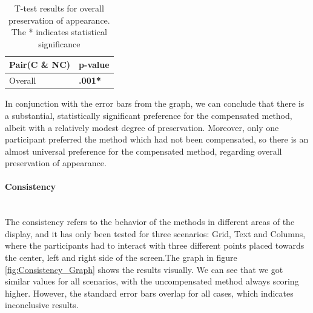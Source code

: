 \documentclass[]{article}
\begin{document}
\begin{table}
\begin{center}
    \begin{tabular}{ | l | l |}
    \hline
    Pair(C \& NC) & \textbf{p-value }\\ \hline
    Overall & \textbf{.001*} \\
    \hline
   	\end{tabular}    
    
\end{center}
\caption{T-test results for overall preservation of appearance. The * indicates statistical significance}
\label{table:OPOA_Test}
\end{table}

In conjunction with the error bars from the graph, we can conclude that there is a substantial, statistically significant preference for the compensated method, albeit with a relatively modest degree of preservation. Moreover, only one participant preferred the method which had not been compensated, so there is an almost universal preference for the compensated method, regarding overall preservation of appearance.


\paragraph{Consistency}\mbox{}\\

The consistency refers to the behavior of the methods in different areas of the display, and it has only been tested for three scenarios: Grid, Text and Columns, where the participants had to interact with three different points placed towards the center, left and right side of the screen.The graph in figure \ref{fig:Consistency_Graph} shows the results visually. We can see that we got similar values for all scenarios, with the uncompensated method always scoring higher. However, the standard error bars overlap for all cases, which indicates inconclusive results.
\end{document}
